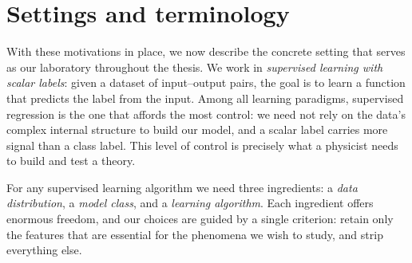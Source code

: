 \section{Settings and terminology}
\label{intro:sec:settings}

With these motivations in place, we now describe the concrete setting that serves as
our laboratory throughout the thesis.
We work in \emph{supervised learning with scalar labels}: given a dataset of
input--output pairs, the goal is to learn a function that predicts the label from
the input.
Among all learning paradigms, supervised regression is the one that affords the most
control: we need not rely on the data's complex internal structure to build our model,
and a scalar label carries more signal than a class label.
This level of control is precisely what a physicist needs to build and test a theory.

For any supervised learning algorithm we need three ingredients: a
\emph{data distribution}, a \emph{model class}, and a \emph{learning algorithm}.
Each ingredient offers enormous freedom, and our choices are guided by a single
criterion: retain only the features that are essential for the phenomena we wish to
study, and strip everything else.

